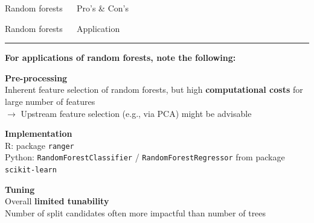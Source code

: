 \documentclass[11pt,compress,t,notes=noshow, xcolor=table]{beamer}
\begin{document}
\begin{frame}{\textcolor{gray!80}{Random forests} ~~ Pro's \& Con's}
\vfill

\small


\end{frame}


\LARGE
\begin{frame}{\textcolor{gray!80}{Random forests} ~~ Application}
\normalsize
\vspace{-0.5cm}
\noindent \textcolor{gray!80}{\rule{\textwidth}{1pt}}

\vspace{0.3cm}

\footnotesize

\textbf{For applications of random forests, note the following:}
\lz

\textbf{\textcolor{gray!80}{Pre-processing}} \\
\smallskip
Inherent feature selection of random forests, but high \textbf{computational 
costs} for large number of features \\
$\rightarrow$ Upstream feature selection (e.g., via PCA) might be advisable
\lz

\textbf{\textcolor{gray!80}{Implementation}} \\
\smallskip
R: package \texttt{ranger}\\
Python: \texttt{RandomForestClassifier} / \texttt{RandomForestRegressor} from 
package \texttt{scikit-learn}
\lz

\textbf{\textcolor{gray!80}{Tuning}} \\
\smallskip
Overall \textbf{limited tunability} \\
Number of split candidates often more impactful than number of trees

\end{frame}

\end{document}
